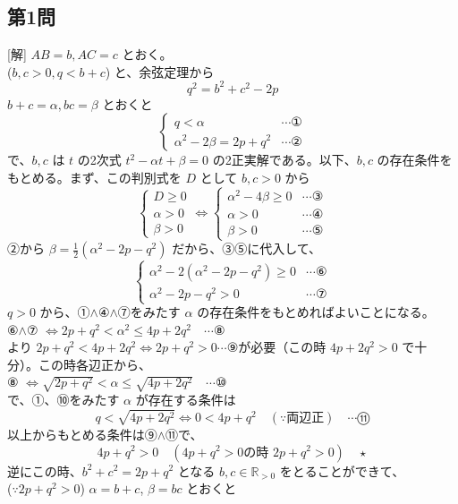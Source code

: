 \documentclass[../main.tex]{subfiles}
\begin{document}
\subsection*{第1問}
[解] $AB=b, AC=c$ とおく。\\
($b, c > 0, q < b+c$) と、余弦定理から
\[ q^2 = b^2 + c^2 - 2p \]
$b+c = \alpha, bc = \beta$ とおくと
\[
  \begin{cases}
    q < \alpha & \cdots \text{①} \\
    \alpha^2 - 2\beta = 2p + q^2 & \cdots \text{②}
  \end{cases}
\]
で、$b, c$ は $t$ の2次式 $t^2 - \alpha t + \beta = 0$ の2正実解である。以下、$b, c$ の存在条件をもとめる。まず、この判別式を $D$ として $b, c > 0$ から
\[
  \begin{cases}
    D \ge 0 \\
    \alpha > 0 \\
    \beta > 0
  \end{cases} \iff
  \begin{cases}
    \alpha^2 - 4\beta \ge 0 & \cdots \text{③} \\
    \alpha > 0 & \cdots \text{④} \\
    \beta > 0 & \cdots \text{⑤}
  \end{cases}
\]
②から $\beta = \frac{1}{2}(\alpha^2 - 2p - q^2)$ だから、③⑤に代入して、
\[
  \begin{cases}
    \alpha^2 - 2(\alpha^2 - 2p - q^2) \ge 0 & \cdots \text{⑥} \\
    \alpha^2 - 2p - q^2 > 0 & \cdots \text{⑦}
  \end{cases}
\]
$q>0$ から、①$\wedge$④$\wedge$⑦をみたす $\alpha$ の存在条件をもとめればよいことになる。\\
⑥$\wedge$⑦ $\iff 2p + q^2 < \alpha^2 \le 4p + 2q^2 \quad \cdots \text{⑧}$\\
より $2p + q^2 < 4p + 2q^2 \iff 2p + q^2 > 0 \cdots \text{⑨}$が必要（この時 $4p + 2q^2 > 0$ で十分）。この時各辺正から、\\
⑧ $\iff \sqrt{2p + q^2} < \alpha \le \sqrt{4p + 2q^2} \quad \cdots \text{⑩}$\\
で、①、⑩をみたす $\alpha$ が存在する条件は
\[ q < \sqrt{4p + 2q^2} \iff 0 < 4p + q^2 \quad (\because \text{両辺正}) \quad \cdots \text{⑪} \]
以上からもとめる条件は⑨$\wedge$⑪で、
\[ 4p + q^2 > 0 \quad (4p + q^2 > 0 \text{の時 } 2p + q^2 > 0) \quad \star \]
逆にこの時、$b^2 + c^2 = 2p + q^2$ となる $b, c \in \mathbb{R}_{>0}$ をとることができて、\\
($\because 2p + q^2 > 0$) $\alpha = b+c$, $\beta = bc$ とおくと
\end{document}

